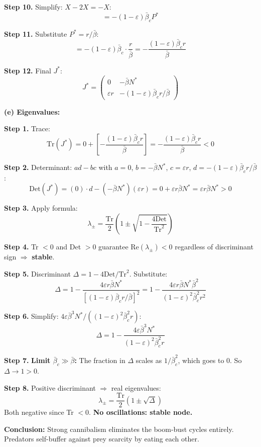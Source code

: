 \documentclass[10pt]{article}
\begin{document}
\begin{solution}
\textbf{Step 10.} Simplify: $X - 2X = -X$:
\[
= -(1-\varepsilon)\bar\beta_c P^*
\]

\textbf{Step 11.} Substitute $P^* = r/\bar\beta$:
\[
= -(1-\varepsilon)\bar\beta_c\cdot\frac{r}{\bar\beta} = -\frac{(1-\varepsilon)\bar\beta_c r}{\bar\beta}
\]

\textbf{Step 12.} Final $J^*$:
\[
\boxed{J^* = \begin{pmatrix} 0 & -\bar\beta N^* \\ \varepsilon r & -(1-\varepsilon)\bar\beta_c r/\bar\beta \end{pmatrix}}
\]

\medskip\textbf{(e) Eigenvalues:}

\textbf{Step 1.} Trace:
\[
\text{Tr}(J^*) = 0 + \left[-\frac{(1-\varepsilon)\bar\beta_c r}{\bar\beta}\right] = -\frac{(1-\varepsilon)\bar\beta_c r}{\bar\beta} < 0
\]

\textbf{Step 2.} Determinant: $ad - bc$ with $a = 0$, $b = -\bar\beta N^*$, $c = \varepsilon r$, $d = -(1-\varepsilon)\bar\beta_c r/\bar\beta$:
\[
\text{Det}(J^*) = (0)\cdot d - (-\bar\beta N^*)(\varepsilon r) = 0 + \varepsilon r\bar\beta N^* = \varepsilon r\bar\beta N^* > 0
\]

\textbf{Step 3.} Apply formula:
\[
\lambda_\pm = \frac{\text{Tr}}{2}\left(1 \pm \sqrt{1 - \frac{4\text{Det}}{\text{Tr}^2}}\right)
\]

\textbf{Step 4.} Tr $< 0$ and Det $> 0$ guarantee $\text{Re}(\lambda_\pm) < 0$ regardless of discriminant sign $\Rightarrow$ \textbf{stable}.

\textbf{Step 5.} Discriminant $\Delta = 1 - 4\text{Det}/\text{Tr}^2$. Substitute:
\[
\Delta = 1 - \frac{4\varepsilon r\bar\beta N^*}{[(1-\varepsilon)\bar\beta_c r/\bar\beta]^2} = 1 - \frac{4\varepsilon r\bar\beta N^*\bar\beta^2}{(1-\varepsilon)^2\bar\beta_c^2 r^2}
\]

\textbf{Step 6.} Simplify: $4\varepsilon\bar\beta^3 N^*/((1-\varepsilon)^2\bar\beta_c^2 r)$:
\[
\Delta = 1 - \frac{4\varepsilon\bar\beta^3 N^*}{(1-\varepsilon)^2\bar\beta_c^2 r}
\]

\textbf{Step 7.} \textbf{Limit $\bar\beta_c \gg \bar\beta$:} The fraction in $\Delta$ scales as $1/\bar\beta_c^2$, which goes to 0. So $\Delta \to 1 > 0$.

\textbf{Step 8.} Positive discriminant $\Rightarrow$ real eigenvalues:
\[
\lambda_\pm = \frac{\text{Tr}}{2}(1 \pm \sqrt\Delta)
\]
Both negative since Tr $< 0$. \textbf{No oscillations: stable node.}

\textbf{Conclusion:} Strong cannibalism eliminates the boom-bust cycles entirely. Predators self-buffer against prey scarcity by eating each other.
\end{solution}
\end{document}

